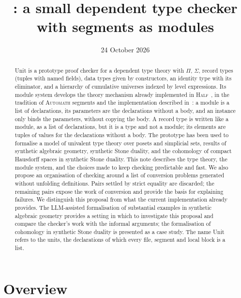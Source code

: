 \documentclass[11pt]{article}
\title{\sys: a small dependent type checker\\with segments as modules}
\author{}
\date{24 October 2026}
\newcommand{\sys}{\textsf{Unit}\xspace}
\theoremstyle{remark}
\begin{document}
\maketitle

\begin{abstract}
\noindent
\sys is a prototype proof checker for a dependent type theory with
$\Pi$, $\Sigma$, record types (tuples with named fields), data types
given by constructors, an identity type with its eliminator, and a
hierarchy of cumulative universes indexed by level expressions. Its
module system develops the theory mechanism already implemented in
\textsc{Half}~\cite{Ced}, in the tradition of \textsc{Automath} segments
and the implementation described in~\cite{Wang}:
a module is a list of declarations, its parameters
are the declarations without a body, and an instance only binds the
parameters, without copying the body. A record type is written like a
module, as a list of declarations, but it is a type and not a module;
its elements are tuples of values for the declarations without a body. The prototype has been used to
formalise a model of univalent type theory over posets and simplicial
sets, results of synthetic algebraic geometry, synthetic Stone duality,
and the cohomology of
compact Hausdorff spaces in synthetic Stone duality. This note describes the type theory, the module
system, and the choices made to keep checking predictable and fast. We
also propose an organisation of checking around a list of conversion
problems generated without unfolding definitions. Pairs settled by strict
equality are discarded; the remaining pairs expose the work of conversion
and provide the basis for explaining failures. We distinguish this
proposal from what the current implementation already provides. The
LLM-assisted formalisation of substantial examples in synthetic algebraic
geometry provides a setting in which to investigate this proposal and
compare the checker's work with the informal arguments; the
formalisation of cohomology in synthetic Stone duality is presented as a
case study. The
name \sys refers to the units, the declarations of which every file,
segment and local block is a list.
\end{abstract}

\tableofcontents

\section{Overview}
\end{document}
